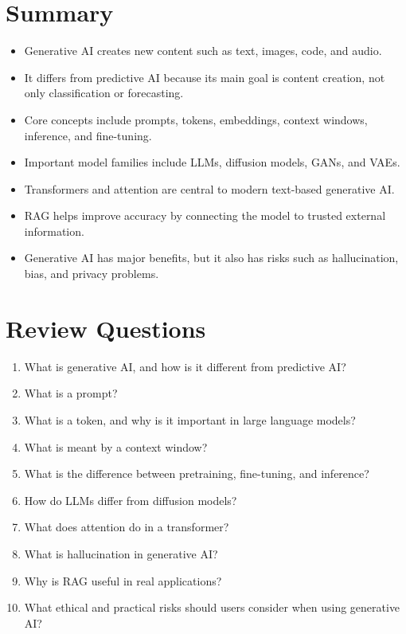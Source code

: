 \documentclass[11pt,a4paper]{article}
\begin{document}
\section{Summary}

\begin{itemize}[leftmargin=*]
  \item Generative AI creates new content such as text, images, code, and audio.
  \item It differs from predictive AI because its main goal is content creation, not only classification or forecasting.
  \item Core concepts include prompts, tokens, embeddings, context windows, inference, and fine-tuning.
  \item Important model families include LLMs, diffusion models, GANs, and VAEs.
  \item Transformers and attention are central to modern text-based generative AI.
  \item RAG helps improve accuracy by connecting the model to trusted external information.
  \item Generative AI has major benefits, but it also has risks such as hallucination, bias, and privacy problems.
\end{itemize}

\section{Review Questions}

\begin{enumerate}[leftmargin=*]
  \item What is generative AI, and how is it different from predictive AI?
  \item What is a prompt?
  \item What is a token, and why is it important in large language models?
  \item What is meant by a context window?
  \item What is the difference between pretraining, fine-tuning, and inference?
  \item How do LLMs differ from diffusion models?
  \item What does attention do in a transformer?
  \item What is hallucination in generative AI?
  \item Why is RAG useful in real applications?
  \item What ethical and practical risks should users consider when using generative AI?
\end{enumerate}
\end{document}
